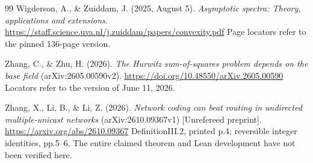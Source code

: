\begin{thebibliography}{99}
Wigderson, A., \& Zuiddam, J. (2025, August 5).
\emph{Asymptotic spectra: Theory, applications and extensions}.
\url{https://staff.science.uva.nl/j.zuiddam/papers/convexity.pdf}
Page locators refer to the pinned 136-page version.


Zhang, C., \& Zhu, H. (2026). \emph{The Hurwitz sum-of-squares
problem depends on the base field} (arXiv:2605.00590v2).
\url{https://doi.org/10.48550/arXiv.2605.00590}
Locators refer to the version of June 11, 2026.

Zhang, X., Li, B., \& Li, Z. (2026).
\emph{Network coding can beat routing in undirected multiple-unicast networks}
(arXiv:2610.09367v1) [Unrefereed preprint].
\url{https://arxiv.org/abs/2610.09367}
DefinitionIII.2, printed p.4; reversible integer identities, pp.5--6.
The entire claimed theorem and Lean development have not been verified here.

\end{thebibliography}
